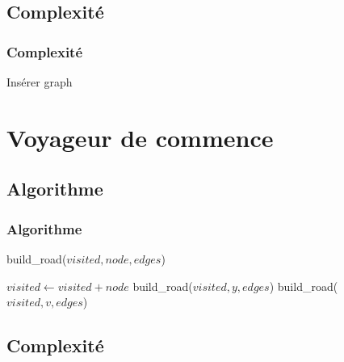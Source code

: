 \documentclass{beamer}
\begin{document}
	\subsection{Complexité}
		\begin{frame}
			\frametitle{Complexité}
			
			Insérer graph
		\end{frame}
	\section{Voyageur de commence}

	\subsection{Algorithme}
		\begin{frame}
			\frametitle{Algorithme}
			
			\begin{algorithm}[H]
				\caption{build\_road($visited, node, edges$)}
				\begin{algorithmic}[H]
					\STATE $visited \leftarrow visited + node$
						\STATE build\_road($visited, y, edges$)
						\ELSE {}
						\STATE build\_road($visited, v, edges$)
						\ENDIF
						\ENDIF
					\ENDFOR
				\end{algorithmic}
			\end{algorithm}
		
		\end{frame}

	\subsection{Complexité}
\end{document}
